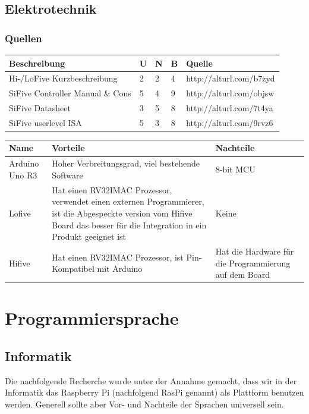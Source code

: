 \documentclass[a4paper]{report}
\begin{document}
\subsection{Elektrotechnik}

\subsubsection{Quellen}
\begin{tabular}{|p{}|p{}|p{}|p{}|p{}|}
	\hline
	\textbf{Beschreibung} & \textbf{U} & \textbf{N} & \textbf{B} & \textbf{Quelle} \\
	\hline
	Hi-/LoFive Kurzbeschreibung & 2 & 2 & 4 & http://alturl.com/b7zyd \\
	\hline
	SiFive Controller Manual \& Cons & 5 & 4 & 9 & http://alturl.com/objsw \\
	\hline
	SiFive Datasheet & 3 & 5  & 8 & http://alturl.com/7t4ya \\
	\hline
	SiFive userlevel ISA & 5 & 3 & 8 & http://alturl.com/9rvz6 \\
	\hline
\end{tabular}

\vspace{1em}
\noindent
\begin{tabular}{|p{}|p{}|p{}|}
  \hline
  \textbf{Name} & \textbf{Vorteile} & \textbf{Nachteile} \\
  \hline
	Arduino Uno R3 & Hoher Verbreitungsgrad, viel bestehende Software & 8-bit MCU \\
	\hline
  Lofive & Hat einen RV32IMAC Prozessor, verwendet einen externen Programmierer, ist die Abgespeckte version vom Hifive Board das besser für die Integration in ein Produkt geeignet ist & Keine \\
  \hline
  Hifive & Hat einen RV32IMAC Prozessor, ist Pin-Kompatibel mit Arduino & Hat die Hardware für die Programmierung auf dem Board \\
  \hline
\end{tabular}
\section{Programmiersprache}


\subsection{Informatik}
Die nachfolgende Recherche wurde unter der Annahme gemacht, dass wir in der Informatik das Raspberry Pi (nachfolgend RasPi genannt) als Plattform benutzen werden. Generell sollte aber Vor- und Nachteile der Sprachen universell sein.
\end{document}
